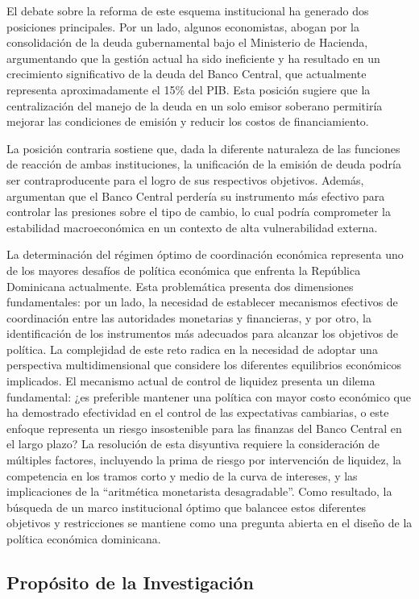 \documentclass[
  man,
  longtable,
  nolmodern,
  notxfonts,
  notimes,
  colorlinks=true,linkcolor=blue,citecolor=blue,urlcolor=blue]{apa7}
\begin{document}
El debate sobre la reforma de este esquema institucional ha generado dos
posiciones principales. Por un lado, algunos economistas, abogan por la
consolidación de la deuda gubernamental bajo el Ministerio de Hacienda,
argumentando que la gestión actual ha sido ineficiente y ha resultado en
un crecimiento significativo de la deuda del Banco Central, que
actualmente representa aproximadamente el 15\% del PIB. Esta posición
sugiere que la centralización del manejo de la deuda en un solo emisor
soberano permitiría mejorar las condiciones de emisión y reducir los
costos de financiamiento.

La posición contraria sostiene que, dada la diferente naturaleza de las
funciones de reacción de ambas instituciones, la unificación de la
emisión de deuda podría ser contraproducente para el logro de sus
respectivos objetivos. Además, argumentan que el Banco Central perdería
su instrumento más efectivo para controlar las presiones sobre el tipo
de cambio, lo cual podría comprometer la estabilidad macroeconómica en
un contexto de alta vulnerabilidad externa.

La determinación del régimen óptimo de coordinación económica representa
uno de los mayores desafíos de política económica que enfrenta la
República Dominicana actualmente. Esta problemática presenta dos
dimensiones fundamentales: por un lado, la necesidad de establecer
mecanismos efectivos de coordinación entre las autoridades monetarias y
financieras, y por otro, la identificación de los instrumentos más
adecuados para alcanzar los objetivos de política. La complejidad de
este reto radica en la necesidad de adoptar una perspectiva
multidimensional que considere los diferentes equilibrios económicos
implicados. El mecanismo actual de control de liquidez presenta un
dilema fundamental: ¿es preferible mantener una política con mayor costo
económico que ha demostrado efectividad en el control de las
expectativas cambiarias, o este enfoque representa un riesgo
insostenible para las finanzas del Banco Central en el largo plazo? La
resolución de esta disyuntiva requiere la consideración de múltiples
factores, incluyendo la prima de riesgo por intervención de liquidez, la
competencia en los tramos corto y medio de la curva de intereses, y las
implicaciones de la ``aritmética monetarista desagradable''. Como
resultado, la búsqueda de un marco institucional óptimo que balancee
estos diferentes objetivos y restricciones se mantiene como una pregunta
abierta en el diseño de la política económica dominicana.

\subsection{Propósito de la
Investigación}\label{propuxf3sito-de-la-investigaciuxf3n}
\end{document}
